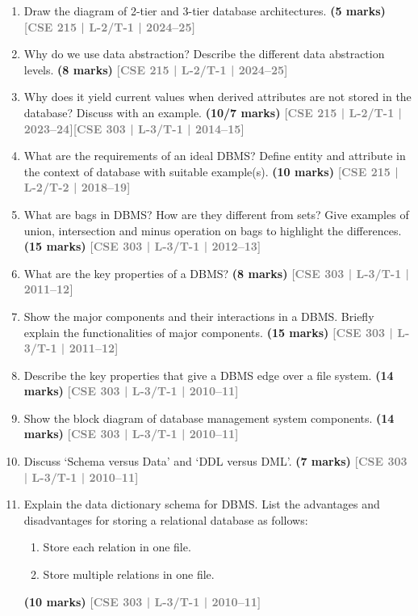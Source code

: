 \documentclass[12pt]{article}
\newcommand{\yr}[1]{\hfill\textcolor{gray}{\small\textbf{[#1]}}}
\newcommand{\mk}[1]{\textcolor{orange!70!black}{\small\textbf{(#1 marks)}}}
\begin{document}
\begin{enumerate}

\item Draw the diagram of 2-tier and 3-tier database architectures.
\mk{5} \yr{CSE 215 | L-2/T-1 | 2024--25}


\item Why do we use data abstraction? Describe the different data abstraction levels.
\mk{8} \yr{CSE 215 | L-2/T-1 | 2024--25}


\item Why does it yield current values when derived attributes are not stored in the database? Discuss with an example.
\mk{10/7} \yr{CSE 215 | L-2/T-1 | 2023--24}\yr{CSE 303 | L-3/T-1 | 2014--15}


\item What are the requirements of an ideal DBMS? Define entity and attribute in the context of database with suitable example(s).
\mk{10} \yr{CSE 215 | L-2/T-2 | 2018--19}


\item What are bags in DBMS? How are they different from sets? Give examples of union, intersection and minus operation on bags to highlight the differences.
\mk{15} \yr{CSE 303 | L-3/T-1 | 2012--13}


\item What are the key properties of a DBMS?
\mk{8} \yr{CSE 303 | L-3/T-1 | 2011--12}


\item Show the major components and their interactions in a DBMS. Briefly explain the functionalities of major components.
\mk{15} \yr{CSE 303 | L-3/T-1 | 2011--12}


\item Describe the key properties that give a DBMS edge over a file system.
\mk{14} \yr{CSE 303 | L-3/T-1 | 2010--11}


\item Show the block diagram of database management system components.
\mk{14} \yr{CSE 303 | L-3/T-1 | 2010--11}


\item Discuss `Schema versus Data' and `DDL versus DML'.
\mk{7} \yr{CSE 303 | L-3/T-1 | 2010--11}


\item Explain the data dictionary schema for DBMS. List the advantages and disadvantages for storing a relational database as follows:
\begin{enumerate}
  \item Store each relation in one file.
  \item Store multiple relations in one file.
\end{enumerate}
\mk{10} \yr{CSE 303 | L-3/T-1 | 2010--11}


\end{enumerate}
\end{document}
